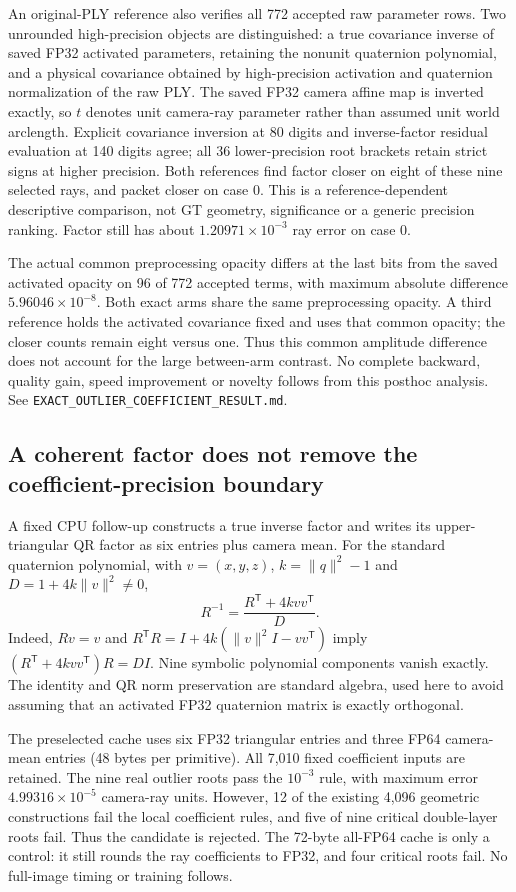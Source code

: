 \documentclass[11pt,a4paper]{article}
\begin{document}
An original-PLY reference also verifies all 772 accepted raw parameter
rows. Two unrounded high-precision objects are distinguished: a true
covariance inverse of saved FP32 activated parameters, retaining the
nonunit quaternion polynomial, and a physical covariance obtained by
high-precision activation and quaternion normalization of the raw PLY.
The saved FP32 camera affine map is inverted exactly, so $t$ denotes
unit camera-ray parameter rather than assumed unit world arclength.
Explicit covariance inversion at 80 digits and inverse-factor residual
evaluation at 140 digits agree; all 36 lower-precision root brackets
retain strict signs at higher precision. Both references find factor
closer on eight of these nine selected rays, and packet closer on
case 0. This is a reference-dependent descriptive comparison, not
GT geometry, significance or a generic precision ranking. Factor
still has about $1.20971\times10^{-3}$ ray error on case 0.

The actual common preprocessing opacity differs at the last bits
from the saved activated opacity on 96 of 772 accepted terms, with
maximum absolute difference $5.96046\times10^{-8}$. Both exact arms
share the same preprocessing opacity. A third reference holds the
activated covariance fixed and uses that common opacity; the closer
counts remain eight versus one. Thus this common amplitude difference
does not account for the large between-arm contrast. No complete
backward, quality gain, speed improvement or novelty follows from
this posthoc analysis. See
\texttt{EXACT\_OUTLIER\_COEFFICIENT\_RESULT.md}.

\subsection{A coherent factor does not remove the coefficient-precision boundary}
A fixed CPU follow-up constructs a true inverse factor and writes its
upper-triangular QR factor as six entries plus camera mean. For the
standard quaternion polynomial, with $v=(x,y,z)$,
$k=\lVert q\rVert^2-1$ and $D=1+4k\lVert v\rVert^2\ne0$,
\[
 R^{-1}=\frac{R^{\mathsf T}+4kvv^{\mathsf T}}{D}.
\]
Indeed, $Rv=v$ and
$R^{\mathsf T}R=I+4k(\lVert v\rVert^2I-vv^{\mathsf T})$ imply
$(R^{\mathsf T}+4kvv^{\mathsf T})R=DI$.
Nine symbolic polynomial components vanish exactly. The identity and
QR norm preservation are standard algebra, used here to avoid assuming
that an activated FP32 quaternion matrix is exactly orthogonal.

The preselected cache uses six FP32 triangular entries and three FP64
camera-mean entries (48 bytes per primitive). All 7,010 fixed coefficient
inputs are retained. The nine real outlier roots pass the $10^{-3}$
rule, with maximum error $4.99316\times10^{-5}$ camera-ray units.
However, 12 of the existing 4,096 geometric constructions fail the
local coefficient rules, and five of nine critical double-layer roots
fail. Thus the candidate is rejected. The 72-byte all-FP64 cache is
only a control: it still rounds the ray coefficients to FP32, and four
critical roots fail. No full-image timing or training follows.
\end{document}
